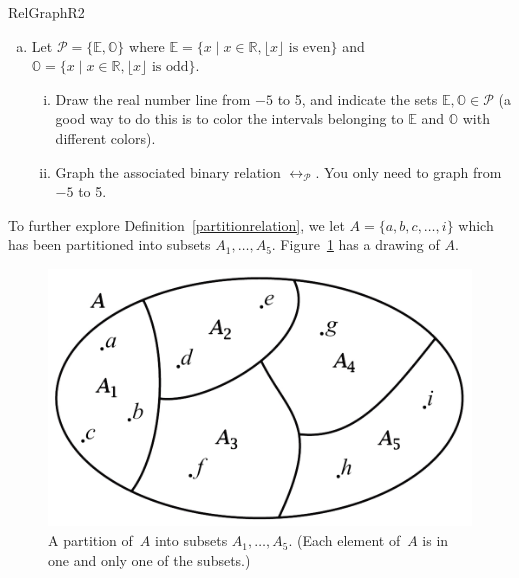 \begin{exercise}{RelGraphR2}
\begin{enumerate}[(a)]
\item Let $\mathcal{P}=\{\mathbb{E},\mathbb{O}\}$ where $\mathbb{E}=\{x \mid x \in \mathbb{R}, \lfloor x \rfloor \text{ is even}\}$ and $\mathbb{O}=\{x \mid x \in \mathbb{R}, \lfloor x \rfloor \text{ is odd}\}$.
\begin{enumerate}[(i)]
\item Draw the real number line from $-5$ to 5, and indicate the sets $\mathbb{E},\mathbb{O}  \in \mathcal{P}$  (a good way to do this is to color the intervals belonging to 
$\mathbb{E}$ and $\mathbb{O}$ with different colors).
\item Graph the associated binary relation $\rel_\mathcal{P}$. You only need to graph from $-5$ to 5.
\end{enumerate}
\end{enumerate}
\end{exercise}

To further explore Definition~\ref{partitionrelation}, we let $A=\{a,b,c,\ldots,i\}$ which has been partitioned into subsets $A_1, \ldots, A_5$. Figure~\ref{fig:partition_discrete} has a drawing of $A$.

\begin{figure}[htbp]
\begin{center}
\includegraphics[scale=0.35]{images/partition_discrete.png}
\caption{A partition of~$A$ into subsets $A_1, \ldots, A_5$. 
(Each element of~$A$ is in one and only one of the subsets.)}\label{fig:partition_discrete}
\end{center}
\end{figure}

